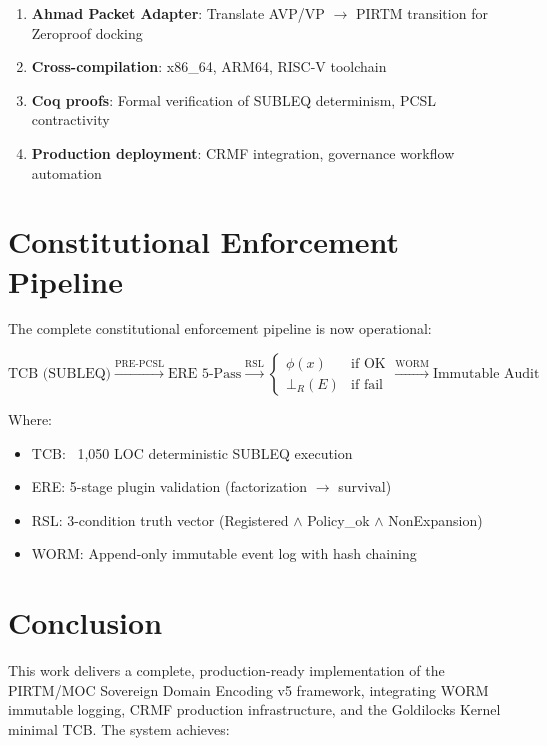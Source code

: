 \documentclass[11pt,a4paper]{article}
\begin{document}
\begin{enumerate}
    \item \textbf{Ahmad Packet Adapter}: Translate AVP/VP $\to$ PIRTM transition for Zeroproof docking
    \item \textbf{Cross-compilation}: x86\_64, ARM64, RISC-V toolchain
    \item \textbf{Coq proofs}: Formal verification of SUBLEQ determinism, PCSL contractivity
    \item \textbf{Production deployment}: CRMF integration, governance workflow automation
\end{enumerate}

\section{Constitutional Enforcement Pipeline}

The complete constitutional enforcement pipeline is now operational:

\begin{equation}
\boxed{
\text{TCB (SUBLEQ)} \xrightarrow{\text{PRE-PCSL}} 
\text{ERE 5-Pass} \xrightarrow{\text{RSL}} 
\begin{cases}
\phi(x) & \text{if OK} \\
\bot_R(E) & \text{if fail}
\end{cases}
\xrightarrow{\text{WORM}} \text{Immutable Audit}
}
\end{equation}

Where:
\begin{itemize}
    \item TCB: ~1,050 LOC deterministic SUBLEQ execution
    \item ERE: 5-stage plugin validation (factorization $\to$ survival)
    \item RSL: 3-condition truth vector (Registered $\land$ Policy\_ok $\land$ NonExpansion)
    \item WORM: Append-only immutable event log with hash chaining
\end{itemize}

\section{Conclusion}

This work delivers a complete, production-ready implementation of the PIRTM/MOC Sovereign Domain Encoding v5 framework, integrating WORM immutable logging, CRMF production infrastructure, and the Goldilocks Kernel minimal TCB. The system achieves:
\end{document}
